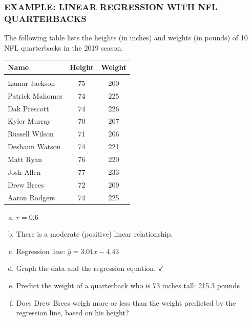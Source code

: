 \documentclass[8pt]{beamer}
\newcommand{\extitle}[1]{\frametitle{\fontfamily{fvs}\selectfont \small\color{black!70!blue!80!cyan}\uppercase{\bfseries Example: #1}}}
\def\solblank{\begin{tcolorbox}[colframe=black!50!blue!50!cyan,
colback=white,
bottomrule=0mm,
rightrule=0mm,
sharp corners=all] 
\vspace{6in}
\text{}
\end{tcolorbox}}
\begin{document}
\begin{frame}
\extitle{Linear Regression with NFL Quarterbacks}
The following table lists the heights (in inches) and weights (in pounds) of 10 NFL quarterbacks in the 2019 season.
{\footnotesize\begin{center}
\begin{tabular}{l c c}
\textbf{Name} & \textbf{Height} & \textbf{Weight}\\
\hline
& & \\
Lamar Jackson & 75 & 200\\
Patrick Mahomes & 74 & 225\\
Dak Prescott & 74 & 226\\
Kyler Murray & 70 & 207\\
Russell Wilson & 71 & 206\\
Deshaun Watson & 74 & 221\\
Matt Ryan & 76 & 220\\
Josh Allen & 77 & 233\\
Drew Brees & 72 & 209\\
Aaron Rodgers & 74 & 225\\
\end{tabular}
\end{center}}
\begin{enumerate}[(a)]
\item $r = 0.6$
\item There is a moderate (positive) linear relationship.
\item Regression line: $\hat{y} = 3.01x - 4.43$
\item Graph the data and the regression equation. $\checkmark$
\item Predict the weight of a quarterback who is 73 inches tall: 215.3 pounds
\item Does Drew Brees weigh more or less than the weight predicted by the regression line, based on his height?
\end{enumerate}

\solblank
\end{frame}
\end{document}

